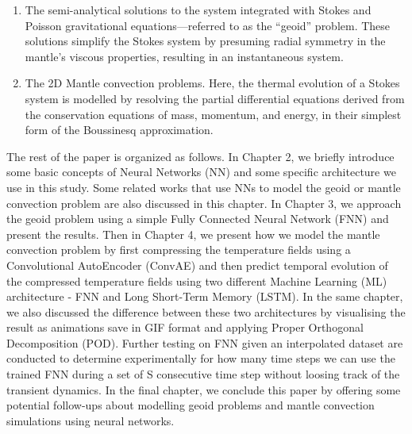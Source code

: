 \begin{enumerate}
    \item The semi-analytical solutions to the system integrated with Stokes and Poisson gravitational equations—referred to as the ``geoid'' problem. These solutions simplify the Stokes system by presuming radial symmetry in the mantle's viscous properties, resulting in an instantaneous system.

    \item The 2D Mantle convection problems. Here, the thermal evolution of a Stokes system is modelled by resolving the partial differential equations derived from the conservation equations of mass, momentum, and energy, in their simplest form of the Boussinesq approximation. 
\end{enumerate}

The rest of the paper is organized as follows. In Chapter 2, we briefly introduce some basic concepts of Neural Networks (NN) and some specific architecture we use in this study. Some related works that use NNs to model the geoid or mantle convection problem are also discussed in this chapter. In Chapter 3, we approach the geoid problem using a simple Fully Connected Neural Network (FNN) and present the results. Then in Chapter 4, we present how we model the mantle convection problem by first compressing the temperature fields using a Convolutional AutoEncoder (ConvAE) and then predict temporal evolution of the compressed temperature fields using two different Machine Learning (ML) architecture - FNN and Long Short-Term Memory (LSTM). In the same chapter, we also discussed the difference between these two architectures by visualising the result as animations save in GIF format and applying Proper Orthogonal Decomposition (POD). Further testing on FNN given an interpolated dataset are conducted to determine experimentally for how many time steps we can use the trained FNN during
a set of S consecutive time step without loosing track of the transient dynamics. In the final chapter, we conclude this paper by offering some potential follow-ups about modelling geoid problems and mantle convection simulations using neural networks.



